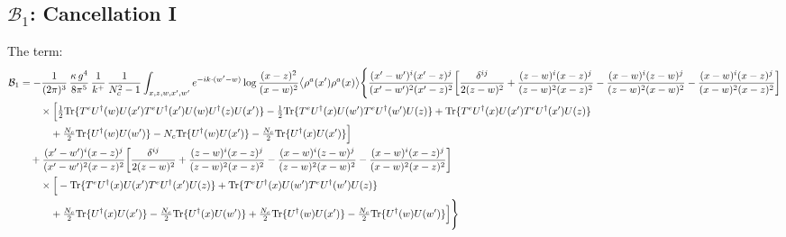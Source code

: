 \documentclass[10pt]{article}
\begin{document}
\subsection*{$\mathcal{B}_{1}$: Cancellation I}
\noindent The term:
\begin{align}
\mathcal{B}_{1}&=-\frac{1}{(2\pi)^{3}}\,\frac{\kappa\,g^{4}}{8\pi^{5}}\,\frac{1}{k^{+}}\,\frac{1}{N_{c}^{2}-1}\int_{x,z,w,x',w'}e^{-ik\cdot(w'-w)}\log\frac{(x-z)^{2}}{(x-w)^{2}}\big\langle\rho^{a}(x')\rho^{a}(x)\big\rangle\Bigg\{\frac{(x'-w')^{i}(x'-z)^{j}}{(x'-w')^{2}(x'-z)^{2}}\bigg[\frac{\delta^{ij}}{2(z-w)^{2}}+\frac{(z-w)^{i}(x-z)^{j}}{(z-w)^{2}(x-z)^{2}}-\frac{(x-w)^{i}(z-w)^{j}}{(z-w)^{2}(x-w)^{2}}-\frac{(x-w)^{i}(x-z)^{j}}{(x-w)^{2}(x-z)^{2}}\bigg]\notag\\
&\qquad\times\Big[\tfrac12{\rm Tr}\{T^{e}U^{\dagger}(w)U(x')T^{e}U^{\dagger}(x')U(w)U^{\dagger}(z)U(x')\}-\tfrac12{\rm Tr}\{T^{e}U^{\dagger}(x)U(w')T^{e}U^{\dagger}(w')U(z)\}+{\rm Tr}\{T^{e}U^{\dagger}(x)U(x')T^{e}U^{\dagger}(x')U(z)\}\notag\\
&\qquad\quad+\tfrac{N_{c}}{2}{\rm Tr}\{U^{\dagger}(w)U(w')\}-N_{c}{\rm Tr}\{U^{\dagger}(w)U(x')\}-\tfrac{N_{c}}{2}{\rm Tr}\{U^{\dagger}(x)U(x')\}\Big]\notag\\
&\quad+\frac{(x'-w')^{i}(x-z)^{j}}{(x'-w')^{2}(x-z)^{2}}\bigg[\frac{\delta^{ij}}{2(z-w)^{2}}+\frac{(z-w)^{i}(x-z)^{j}}{(z-w)^{2}(x-z)^{2}}-\frac{(x-w)^{i}(z-w)^{j}}{(z-w)^{2}(x-w)^{2}}-\frac{(x-w)^{i}(x-z)^{j}}{(x-w)^{2}(x-z)^{2}}\bigg]\notag\\
&\qquad\times\Big[-{\rm Tr}\{T^{e}U^{\dagger}(x)U(x')T^{e}U^{\dagger}(x')U(z)\}+{\rm Tr}\{T^{e}U^{\dagger}(x)U(w')T^{e}U^{\dagger}(w')U(z)\}\notag\\
&\qquad\quad+\tfrac{N_{c}}{2}{\rm Tr}\{U^{\dagger}(x)U(x')\}-\tfrac{N_{c}}{2}{\rm Tr}\{U^{\dagger}(x)U(w')\}+\tfrac{N_{c}}{2}{\rm Tr}\{U^{\dagger}(w)U(x')\}-\tfrac{N_{c}}{2}{\rm Tr}\{U^{\dagger}(w)U(w')\}\Big]\Bigg\}\notag\\[6pt]
\end{align}
\end{document}
